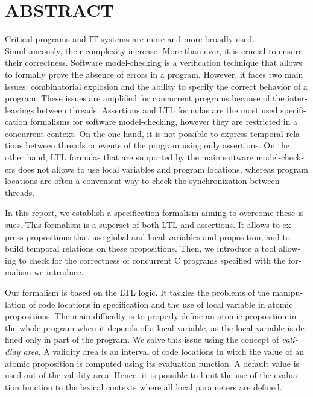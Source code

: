 %

\chapter*{ABSTRACT}\thispagestyle{headings}
%
\begin{otherlanguage}{english}

Critical programs and IT systems are more and more broadly used. Simultaneously,
their complexity increase. More than ever, it is crucial to ensure their
correctness. Software model-checking is a verification technique that allows to
formally prove the absence of errors in a program. However, it faces two main
issues: combinatorial explosion and the ability to specify the correct behavior
of a program. These issues are amplified for concurrent programs because of the
interleavings between threads. Assertions and LTL formulas are the most used
specification formalisms for software model-checking, however they are
restricted in a concurrent context. On the one hand, it is not possible to
express temporal relations between threads or events of the program using only
assertions. On the other hand, LTL formulas that are supported by the main
software model-checkers does not allows to use local variables and program
locations, whereas program locations are often a convenient way to check the
synchronization between threads.

In this report, we establish a specification formalism aiming to overcome these
issues. This formalism is a superset of both LTL and assertions. It allows to
express propositions that use global and local variables and proposition, and to
build temporal relations on these propositions. Then, we introduce a tool
allowing to check for the correctness of concurrent C programs specified with
the formalism we introduce.

Our formalism is based on the LTL logic. It tackles the problems of the
manipulation of code locations in specification and the use of local variable
in atomic propositions. The main difficulty is to properly define an atomic
proposition in the whole program when it depends of a local variable, as the
local variable is defined only in part of the program. We solve this issue using
the concept of \emph{valididy area}. A validity area is an interval of code
locations in witch the value of an atomic proposition is computed using its
evaluation function. A default value is used out of the validity area. Hence, it
is possible to limit the use of the evaluation function to the lexical contexts
where all local parameters are defined.


\end{otherlanguage}
